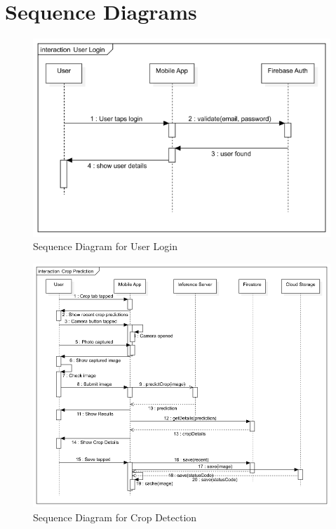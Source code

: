 \documentclass[../Report.tex]{subfiles}
\begin{document}
\section{Sequence Diagrams}
\begin{figure}[H]
    \centering
    \includegraphics[width=0.95\linewidth]{images/seq_user_login.png}
    \caption{Sequence Diagram for User Login}
    \label{fig:seq_1}
\end{figure}

\begin{figure}[H]
    \centering
    \includegraphics[width=0.95\linewidth]{images/seq_crop.png}
    \caption{Sequence Diagram for Crop Detection}
    \label{fig:seq_2}
\end{figure}
\end{document}

